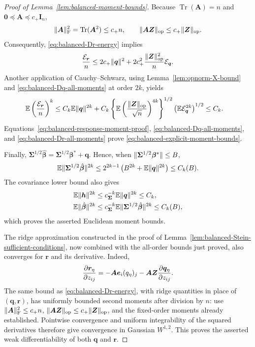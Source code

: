 \documentclass{article}
\theoremstyle{plain}
\theoremstyle{definition}
\theoremstyle{definition}
\newcommand{\boldzero}{\mathbf{0}}
\DeclarePairedDelimiter\norm{\lVert}{\rVert}
\DeclareMathOperator{\trace}{Tr}
\def\E{{\mathbb{E}}}
\def\mathbold{\boldsymbol}
\def\cal{\mathcal}
\def\bA{\mathbold{A}}\def\calA{{\cal A}}\def\scrA{{\mathscr A}}\def\Ahat{\widehat{A}}\def\Atil{{\widetilde A}}
\def\bh{\mathbold{h}}\def\hhat{\widehat{h}}\def\htil{\widetilde{h}}
\def\bI{\mathbold{I}}\def\hbI{{\widehat{\bI}}}\def\tbI{{\widetilde{\bI}}}
\def\bq{\mathbold{q}}\def\qhat{\widehat{q}}\def\qtil{\widetilde{q}}\def\qbar{{\overline q}}
\def\br{\mathbold{r}}\def\rhat{\widehat{r}}\def\rtil{\widetilde{r}}\def\rbar{{\overline r}}
\def\be{\mathbold{e}}
\def\bZ{\mathbold{Z}}\def\hbZ{{\widehat{\bZ}}}\def\tbZ{{\widetilde{\bZ}}}
\def\bbeta{\mathbold{\beta}}\def\betahat{\widehat{\beta}}\def\hbeta{\widehat{\beta}}
\def\hbbeta{\hat{\bbeta}{}}
\def\bSigma{\mathbold{\Sigma}}\def\hbSigma{{\widehat{\bSigma}}}
\begin{document}
\begin{proof}[Proof of Lemma~\ref{lem:balanced-moment-bounds}]
Because $\trace(\bA)=n$ and
$\boldzero\preceq\bA\preceq c_+\bI_n$,
\begin{align*}
    \norm{\bA}_{\rm F}^2
    =\trace(\bA^2)\leq c_+n,
    \qquad
    \norm{\bA\bZ}_{\rm op}\leq c_+\norm{\bZ}_{\rm op}.
\end{align*}
Consequently, \eqref{eq:balanced-Dr-energy} implies
\begin{align*}
    \frac{\calE_{\br}}{n}
    \leq 2c_+\norm{\bq}^2
       +2c_+^2\frac{\norm{\bZ}_{\rm op}^2}{n}\calE_{\bq}.
\end{align*}
Another application of Cauchy--Schwarz, using
Lemma~\ref{lem:opnorm-X-bound} and
\eqref{eq:balanced-Dq-all-moments} at order $2k$, yields
\begin{align}
    \E\left(\frac{\calE_{\br}}{n}\right)^k
    &\leq C_k\E\norm{\bq}^{2k}
       +C_k
        \left\{\E\left(
           \frac{\norm{\bZ}_{\rm op}}{\sqrt n}
        \right)^{4k}\right\}^{1/2}
        \left(\E\calE_{\bq}^{2k}\right)^{1/2}
     \leq C_k.
    \label{eq:balanced-Dr-all-moments}
\end{align}
Equations~\eqref{eq:balanced-response-moment-proof},
\eqref{eq:balanced-Dq-all-moments}, and
\eqref{eq:balanced-Dr-all-moments} prove
\eqref{eq:balanced-explicit-moment-bounds}.

Finally,
$\bSigma^{1/2}\hbbeta=\bSigma^{1/2}\bbeta^*+\bq$.  Hence, when
$\norm{\bSigma^{1/2}\bbeta^*}\leq B$,
\begin{align*}
    \E\norm{\bSigma^{1/2}\hbbeta}^{2k}
    \leq 2^{2k-1}\left(B^{2k}+\E\norm{\bq}^{2k}\right)
    \leq C_k(B).
\end{align*}
The covariance lower bound also gives
\begin{align*}
    \E\norm{\bh}^{2k}
    &\leq c_{\bSigma}^{-k}\E\norm{\bq}^{2k}\leq C_k,\\
    \E\norm{\hbbeta}^{2k}
    &\leq c_{\bSigma}^{-k}
       \E\norm{\bSigma^{1/2}\hbbeta}^{2k}
      \leq C_k(B),
\end{align*}
which proves the asserted Euclidean moment bounds.

The ridge approximation constructed in the proof of
Lemma~\ref{lem:balanced-Stein-sufficient-conditions}, now combined with the
all-order bounds just proved, also converges for $\br$ and its derivative.
Indeed,
\begin{align*}
    \pdv{\br_\eta}{z_{ij}}
    =-\bA\be_i(q_\eta)_j
      -\bA\bZ\pdv{\bq_\eta}{z_{ij}}.
\end{align*}
The same bound as \eqref{eq:balanced-Dr-energy}, with ridge quantities
in place of $(\bq,\br)$, has uniformly bounded second moments after
division by $n$: use $\norm{\bA}_{\rm F}^2\leq c_+n$,
$\norm{\bA\bZ}_{\rm op}\leq c_+\norm{\bZ}_{\rm op}$, and the fixed-order
moments already established.  Pointwise convergence and uniform
integrability of the squared derivatives therefore give convergence in
Gaussian $W^{1,2}$.  This proves the asserted weak differentiability
of both $\bq$ and $\br$.
\end{proof}
\end{document}
